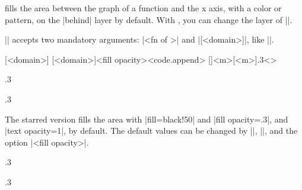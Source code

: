 \icmd{\tzfnarea} fills the area between the graph of a function and the x axis, with a color or pattern, on the |behind| layer by default.
With \icmd{\settzfnarealayer}, you can change the layer of |\tzfnarea|.

|\tzfnarea| accepts two mandatory arguments: |{<fn of \x>}| and |[<domain>]|, like |\tzfn|.

\begin{tzdef}{}
[<domain>]
[<domain>]{<fill opacity>}<code.append>
  []{<m>}[<m>]{.3}<>
\end{tzdef}

\begin{tzcode}{.3}
{}
\end{tzcode}

\begin{tzcode}{.3}
\end{tzcode}


The starred version \icmd{\tzfnarea*} fills the area with |fill=black!50| and |fill opacity=.3|, and |text opacity=1|, by default.  The default values can be changed by |\settzfillcolor|, |\settzfillopacity|, and the option |{<fill opacity>}|.

\begin{tzcode}{.3}
{}
\end{tzcode}


\begin{tzcode}{.3}
\end{tzcode}


